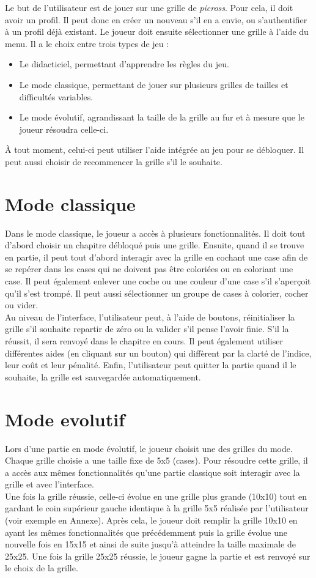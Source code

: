 \documentclass{report}
\begin{document}
	Le but de l'utilisateur est de jouer sur une grille de \textit{picross}.
Pour cela, il doit avoir un profil. Il peut donc en créer un nouveau s'il en a envie, ou s'authentifier à un profil déjà existant.
	Le joueur doit ensuite sélectionner une grille à l'aide du menu. Il a le choix entre trois types de jeu :
	\begin{itemize}
	\item Le didacticiel, permettant d'apprendre les règles du jeu. 
	\item Le mode classique, permettant de jouer sur plusieurs grilles de tailles et difficultés variables.
	\item Le mode évolutif, agrandissant la taille de la grille au fur et à mesure que le joueur résoudra celle-ci.
	\end{itemize}
	À tout moment, celui-ci peut utiliser l'aide intégrée au jeu pour se débloquer. Il peut aussi choisir de recommencer la grille s'il le souhaite.

      
	\section{Mode classique}
		Dans le mode classique, le joueur a accès à plusieurs fonctionnalités. Il doit tout d'abord choisir un chapitre débloqué puis une grille. Ensuite, quand il se trouve en partie, il peut tout d'abord interagir avec la grille en cochant une case afin de se repérer dans les cases qui ne doivent pas être coloriées ou en coloriant une case. Il peut également enlever une coche ou une couleur d'une case s'il s'aperçoit qu'il s'est trompé. Il peut aussi sélectionner un groupe de cases à colorier, cocher ou vider. \\
		Au niveau de l'interface, l'utilisateur peut, à l'aide de boutons, réinitialiser la grille s'il souhaite repartir de zéro ou la valider s'il pense l'avoir finie. S'il la réussit, il sera renvoyé dans le chapitre en cours. Il peut également utiliser différentes aides (en cliquant sur un bouton) qui diffèrent par la clarté de l'indice, leur coût et leur pénalité. Enfin, l'utilisateur peut quitter la partie quand il le souhaite, la grille est sauvegardée automatiquement.
	
	\section{Mode evolutif}
	
	Lors d'une partie en mode évolutif, le joueur choisit une des grilles du mode. Chaque grille choisie a une taille fixe de 5x5 (cases). Pour résoudre cette grille, il a accès aux mêmes fonctionnalités qu'une partie classique soit interagir avec la grille et avec l'interface. \\
Une fois la grille réussie, celle-ci évolue en une grille plus grande (10x10) tout en gardant le coin supérieur gauche identique à la grille 5x5 réalisée par l'utilisateur (voir exemple en Annexe). Après cela, le joueur doit remplir la grille 10x10 en ayant les mêmes fonctionnalités que précédemment puis la grille évolue une nouvelle fois en 15x15 et ainsi de suite jusqu'à atteindre la taille maximale de 25x25. Une fois la grille 25x25 réussie, le joueur gagne la partie et est renvoyé sur le choix de la grille.
	
\end{document}
